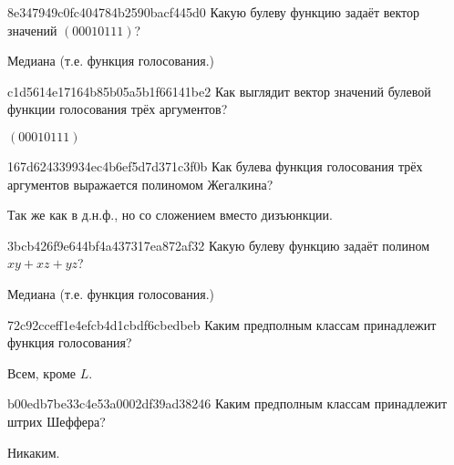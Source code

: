 \begin{note}{8e347949c0fc404784b2590bacf445d0}
    Какую булеву функцию задаёт вектор значений \({ (00010111) }\)?

    \begin{cloze}{1}
        Медиана (т.е. функция голосования.)
    \end{cloze}
\end{note}

\begin{note}{c1d5614e17164b85b05a5b1f66141be2}
    Как выглядит вектор значений булевой функции голосования трёх аргументов?

    \begin{cloze}{1}
        \({ (00010111) }\)
    \end{cloze}
\end{note}

\begin{note}{167d624339934ec4b6ef5d7d371c3f0b}
    Как булева функция голосования трёх аргументов выражается полиномом Жегалкина?

    \begin{cloze}{1}
        Так же как в д.н.ф., но со сложением вместо дизъюнкции.
    \end{cloze}
\end{note}

\begin{note}{3bcb426f9e644bf4a437317ea872af32}
    Какую булеву функцию задаёт полином \({ xy + xz + yz }\)?

    \begin{cloze}{1}
        Медиана (т.е. функция голосования.)
    \end{cloze}
\end{note}

\begin{note}{72c92cceff1e4efcb4d1cbdf6cbedbeb}
    Каким предполным классам принадлежит функция голосования?

    \begin{cloze}{1}
        Всем, кроме \({ L }\).
    \end{cloze}
\end{note}

\begin{note}{b00edb7be33c4e53a0002df39ad38246}
    Каким предполным классам принадлежит штрих Шеффера?

    \begin{cloze}{1}
        Никаким.
    \end{cloze}
\end{note}

